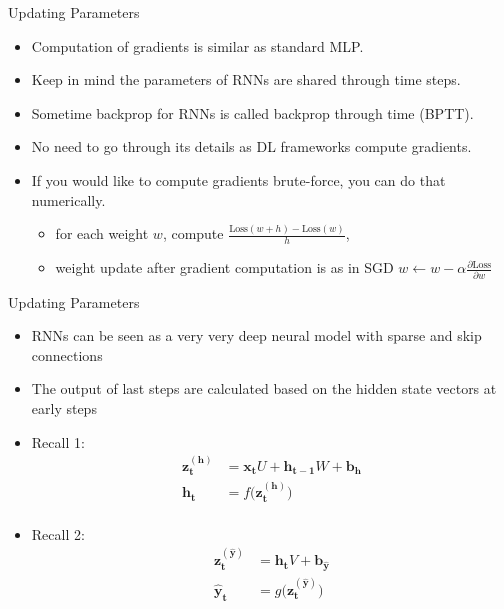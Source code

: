 
\begin{frame}{Updating Parameters}
\begin{itemize}
    \item Computation of gradients is similar as standard MLP.
    \item Keep in mind the parameters of RNNs are shared through time steps. 
    \item Sometime backprop for RNNs is called backprop through time (BPTT). 
    \item No need to go through its details as DL frameworks compute gradients. 
    \item If you would like to compute gradients brute-force, you can do that numerically. 
    \begin{itemize}
        \item for each weight $w$, compute $\frac{\text{Loss}(w+h) - \text{Loss}(w)}{h}$, 
        \item weight update after gradient computation is as in SGD $w \longleftarrow w - \alpha \frac{\partial \text{Loss}}{\partial w}$
    \end{itemize}
\end{itemize}
\end{frame}

\begin{frame}{Updating Parameters}
\begin{itemize}
    \item RNNs can be seen as a very very deep neural model with sparse and skip connections
    \item The output of last steps are calculated based on the hidden state vectors at early steps
    \item Recall 1:
    \begin{equation*}
    \begin{split}
            \bm{z^{(h)}_t} & = \bm{x_t}U + \bm{h_{t-1}}W + \bm{b_h} \\
            \bm{h_t} & =  f \big( \bm{z^{(h)}_t} \big) \\
    \end{split}
    \end{equation*}
    \item Recall 2:
        \begin{equation*}
        \begin{split}
            \bm{z^{(\hat{y})}_t} & = \bm{h_t}V + \bm{b_{\hat{y}}}  \\ 
            \bm{\hat{y}_t} & =  g \big(  \bm{z^{(\hat{y})}_t} \big) 
            \end{split}
        \end{equation*}

\end{itemize}    
\end{frame}


